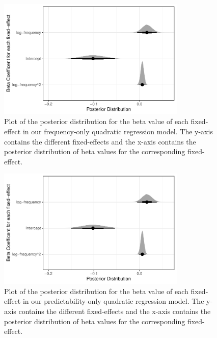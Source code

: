 \documentclass[
  authoryear,
  preprint,
  1p,
  onecolumn]{elsarticle}
\begin{document}
\begin{figure}[H]

{\centering \includegraphics[width=0.8\textwidth,height=\textheight]{quarto-writeup_files/figure-pdf/FreqOnlyBetaPlot-1.pdf}

}

\caption{Plot of the posterior distribution for the beta value of each
fixed-effect in our frequency-only quadratic regression model. The
y-axis contains the different fixed-effects and the x-axis contains the
posterior distribution of beta values for the corresponding
fixed-effect.}

\end{figure}%

\begin{figure}[H]

{\centering \includegraphics[width=0.8\textwidth,height=\textheight]{quarto-writeup_files/figure-pdf/PredicOnlyBetaPlot-1.pdf}

}

\caption{Plot of the posterior distribution for the beta value of each
fixed-effect in our predictability-only quadratic regression model. The
y-axis contains the different fixed-effects and the x-axis contains the
posterior distribution of beta values for the corresponding
fixed-effect.}

\end{figure}%
\end{document}
